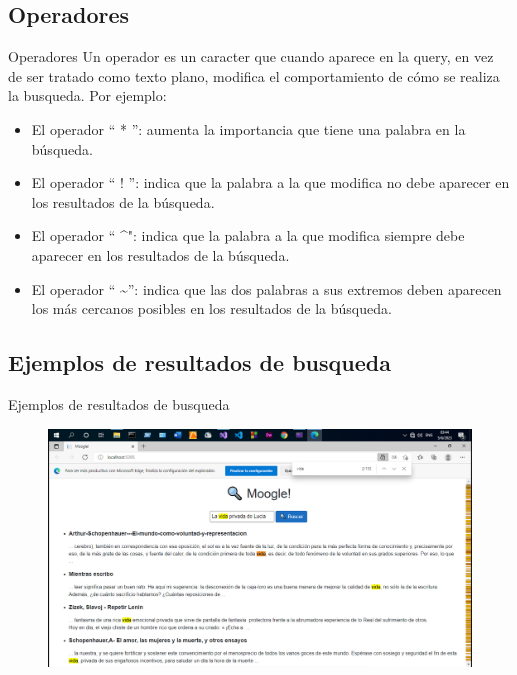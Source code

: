 \subsection{Operadores}
\begin{frame}{Operadores}
        Un operador es un caracter que cuando aparece en la query, en vez de ser tratado como texto plano,
        modifica el comportamiento de cómo se realiza la busqueda. Por ejemplo:
        \begin{itemize}
                \item El operador “ * ”: aumenta la importancia que tiene una palabra en la búsqueda.
                \item El operador “ ! ”: indica que la palabra a la que modifica no debe aparecer en los resultados de
                la búsqueda. 
                \item El operador “ \textasciicircum \space ": indica que la palabra a la que modifica siempre debe aparecer en los resultados
                de la búsqueda.
                \item El operador “ \textasciitilde \space ”: indica que las dos palabras a sus extremos deben aparecen los más cercanos
                posibles en los resultados de la búsqueda.   
        \end{itemize}
\end{frame}

\subsection{Ejemplos de resultados de busqueda}
\begin{frame}{Ejemplos de resultados de busqueda}
        \begin{figure}
                \includegraphics[width=0.9\framewidth]{../Informe/fotos/08 - Resultados (1).png}
        \end{figure}
\end{frame}

